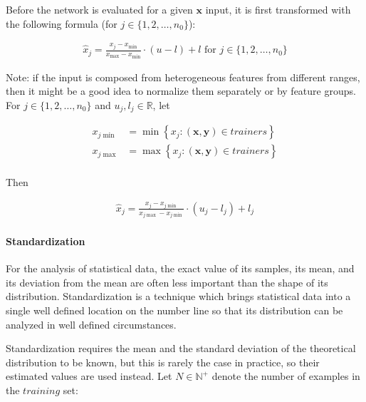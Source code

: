 \documentclass[titlepage]{article}
\begin{document}
          Before the network is evaluated for a given $\mathbf{x}$ input, it is
          first transformed with the following formula
          (for $j \in \{1, 2, \dots, n_0\}$):

          \begin{align*}
            \hat{x}_j
              = \frac{x_j - x_{\min}}{x_{\max} - x_{\min}} \cdot (u - l) + l
              \text{ for } j \in \{ 1, 2, \dots, n_0 \}
          \end{align*}

          Note: if the input is composed from heterogeneous features from
          different ranges, then it might be a good idea to normalize them
          separately or by feature groups.
          For $j \in \{1, 2, \dots, n_0\}$ and $u_j, l_j \in \mathbb{R}$, let

          \begin{align*}
            x_{j \min} & = \min\left\{
              x_j : (\mathbf{x}, \mathbf{y}) \in trainers
            \right\} \\
            x_{j \max} & = \max\left\{
              x_j : (\mathbf{x}, \mathbf{y}) \in trainers
            \right\} \\
          \end{align*}

          Then

          \begin{align*}
            \hat{x}_j
              = \frac{x_j - x_{j \min}}{x_{j \max} - x_{j \min}}
                \cdot (u_j - l_j) + l_j
          \end{align*}

        \paragraph{Standardization}

          For the analysis of statistical data, the exact value of its samples,
          its mean, and its deviation from the mean are often less important
          than the shape of its distribution. Standardization is a technique
          which brings statistical data into a single well defined location on
          the number line so that its distribution can be analyzed in well
          defined circumstances.

          Standardization requires the mean and the standard deviation of the
          theoretical distribution to be known, but this is rarely the case in
          practice, so their estimated values are used instead. Let
          $N \in \mathbb{N}^+$ denote the number of examples in the $training$
          set:
\end{document}
